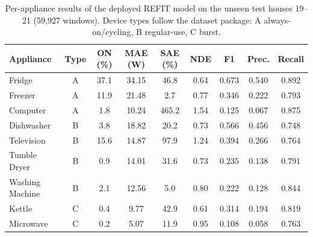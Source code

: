 \begin{table}[H]
\centering
\caption{Per-appliance results of the deployed REFIT model on the unseen test houses 19--21 (59,927 windows). Device types follow the dataset package: A always-on/cycling, B regular-use, C burst.}
\label{tab:refit_per_appliance}
\footnotesize
\begin{tabular}{@{}lcccccccc@{}}
\toprule
Appliance & Type & ON (\%) & MAE (W) & SAE (\%) & NDE & F1 & Prec. & Recall \\
\midrule
Fridge & A & 37.1 & 34.15 & 46.8 & 0.64 & 0.673 & 0.540 & 0.892 \\
Freezer & A & 11.9 & 21.48 & 2.7 & 0.77 & 0.346 & 0.222 & 0.793 \\
Computer & A & 1.8 & 10.24 & 465.2 & 1.54 & 0.125 & 0.067 & 0.875 \\
Dishwasher & B & 3.8 & 18.82 & 20.2 & 0.73 & 0.566 & 0.456 & 0.748 \\
Television & B & 15.6 & 14.87 & 97.9 & 1.24 & 0.394 & 0.266 & 0.764 \\
Tumble Dryer & B & 0.9 & 14.01 & 31.6 & 0.73 & 0.235 & 0.138 & 0.791 \\
Washing Machine & B & 2.1 & 12.56 & 5.0 & 0.80 & 0.222 & 0.128 & 0.844 \\
Kettle & C & 0.4 & 9.77 & 42.9 & 0.61 & 0.314 & 0.194 & 0.819 \\
Microwave & C & 0.2 & 5.07 & 11.9 & 0.95 & 0.108 & 0.058 & 0.763 \\
\bottomrule
\end{tabular}
\end{table}

